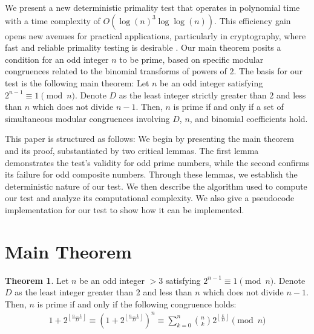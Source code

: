 \documentclass{article}
\theoremstyle{plain}
\theoremstyle{definition}
\newtheorem{theorem}{Theorem}
\begin{document}
We present a new deterministic primality test that operates in polynomial time with a time complexity of $O(\log(n)^3 \log\log(n))$. This efficiency gain opens new avenues for practical applications, particularly in cryptography, where fast and reliable primality testing is desirable \cite{pomerance1984}. Our main theorem posits a condition for an odd integer \( n \) to be prime, based on specific modular congruences related to the binomial transforms of powers of $2$. The basis for our test is the following main theorem: Let \( n \) be an odd integer satisfying \( 2^{n-1} \equiv 1 \pmod{n} \). Denote \( D \) as the least integer strictly greater than \( 2 \) and less than \( n \) which does not divide \( n-1 \). Then, \( n \) is prime if and only if a set of simultaneous modular congruences involving \( D \), \( n \), and binomial coefficients hold.

This paper is structured as follows: We begin by presenting the main theorem and its proof, substantiated by two critical lemmas. The first lemma demonstrates the test's validity for odd prime numbers, while the second confirms its failure for odd composite numbers. Through these lemmas, we establish the deterministic nature of our test. We then describe the algorithm used to compute our test and analyze its computational complexity. We also give a pseudocode implementation for our test to show how it can be implemented.

\section{Main Theorem}

\begin{theorem}
\label{theorem:1}
    Let $n$ be an odd integer $> 3$ satisfying $2^{n-1} \equiv 1 \pmod{n}$. Denote $D$ as the least integer greater than $2$ and less than $n$ which does not divide $n-1$. Then, $n$ is prime if and only if the following congruence holds:
    \begin{align}
        1 + 2^{\left\lfloor \frac{n-1}{D} \right\rfloor} \equiv \left(1 + 2^{\left\lfloor \frac{n-1}{D} \right\rfloor}\right)^{n} \equiv \sum_{k=0}^{n} \binom{n}{k}2^{\left\lfloor \frac{k}{D} \right\rfloor} \pmod{n}
    \end{align}
\end{theorem}
\end{document}
